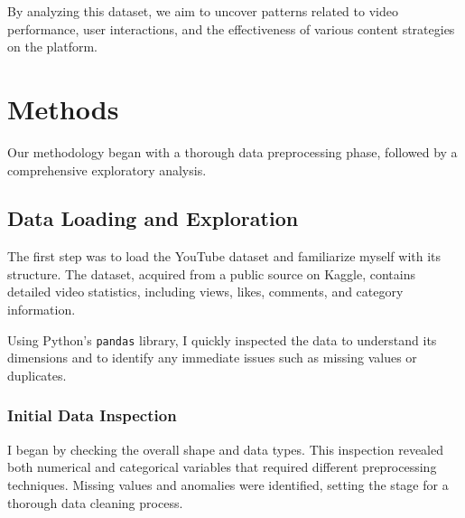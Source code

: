 \documentclass[a4paper]{article}
\begin{document}
\begin{multicols}{2}
By analyzing this dataset, we aim to uncover patterns related to video performance, user interactions, and the effectiveness of various content strategies on the platform.






\section{Methods}
 Our methodology began with a thorough data preprocessing phase, followed by a comprehensive exploratory analysis.

\subsection{Data Loading and Exploration} The first step was to load the YouTube dataset and familiarize myself with its structure. The dataset, acquired from a public source on Kaggle, contains detailed video statistics, including views, likes, comments, and category information.\

Using Python's 
\texttt{pandas} library, I quickly inspected the data to understand its dimensions and to identify any immediate issues such as missing values or duplicates.

\subsubsection{Initial Data Inspection} I began by checking the overall shape and data types. This inspection revealed both numerical and categorical variables that required different preprocessing techniques. Missing values and anomalies were identified, setting the stage for a thorough data cleaning process.

\end{multicols} 
\end{document}

